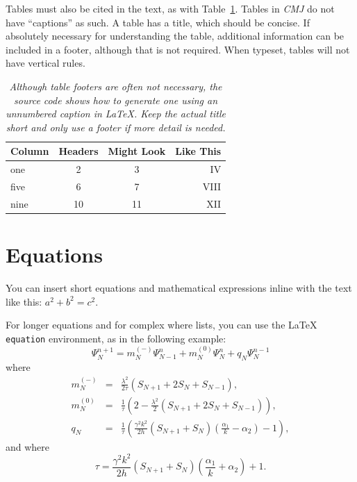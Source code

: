 \documentclass[letterpaper, 12pt]{article}
\begin{document}
Tables must also be cited in the text, as with Table~\ref{tab:myTable}. Tables in \emph{CMJ} do not have ``captions'' as such. A table has a title, which should be concise. If absolutely necessary for understanding the table, additional information can be included in a footer, although that is not required. When typeset, tables will not have vertical rules.

\begin{table}
\caption{Sample Table with Title}
\centering
\begin{tabular}{lccr}
  \hline
  \textbf{Column} & \textbf{Headers} & \textbf{Might Look} & \textbf{Like This}  \\
  \hline
  one & 2 & 3 & IV \\
  five & 6 & 7 & VIII \\
  nine & 10 & 11 & XII \\
   \hline
\end{tabular}
\caption*{\textnormal{\emph{\small Although table footers are often not necessary, the source code shows how to generate one using an unnumbered caption in LaTeX. Keep the actual title short and only use a footer if more detail is needed.}}}
\label{tab:myTable}
\end{table}%


\section{Equations}
You can insert short equations and mathematical expressions inline with the text like this: $a^2 + b^2 = c^2$.

For longer equations and for complex where lists, you can use the LaTeX \texttt{equation} environment, as in the following example:
\begin{equation}
	\label{radupdate}
		\Psi_{N}^{n+1} = m_{N}^{(-)}\Psi_{N-1}^{n}+m_{N}^{(0)}\Psi_{N}^{n} + q_{N}\Psi_{N}^{n-1}
\end{equation}
where
\begin{eqnarray*}
	m_{N}^{(-)} &=& \frac{\lambda^2}{2\tau}\left(S_{N+1}+2S_{N}+S_{N-1}\right) ,\\
	m_{N}^{(0)} &=& \frac{1}{\tau}\left(2-\frac{\lambda^2}{2}\left(S_{N+1}+2S_{N}+S_{N-1}\right)\right) ,\\
	q_{N} &=& \frac{1}{\tau}\left(\frac{\gamma^2 k^2}{2h}\left(S_{N+1}+S_{N}\right)\left(\frac{\alpha_{1}}{k}-\alpha_{2}\right)-1\right) ,
\end{eqnarray*}
and where 
\begin{equation*}
	\tau = \frac{\gamma^2 k^2}{2h}\left(S_{N+1}+S_{N}\right)\left(\frac{\alpha_{1}}{k}+\alpha_{2}\right)+1 .
\end{equation*}
\end{document}
